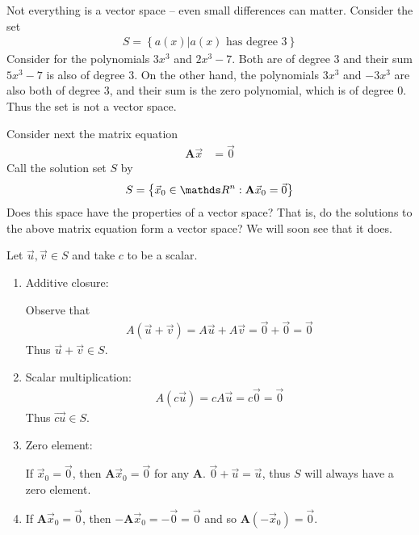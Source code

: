 \documentclass[11pt]{article}
\newcommand{\mat}[1]{\mathbf{#1}}
\newcommand{\vek}[1]{\vec{#1}}
\begin{document}
Not everything is a vector space -- even small differences can matter. Consider the set
\begin{align*}
S = \left\{ a(x) | \text{$a(x)$ has degree $3$} \right\}
\end{align*}
Consider for the polynomials $3 x^3$ and $2x^3 - 7$. Both are of degree $3$ and their sum $5x^3 - 7$ is also of degree $3$. On the other hand, the polynomials $3 x^3$ and $-3x^3$ are also both of degree $3$, and their sum is the zero polynomial, which is of degree $0$. Thus the set is not a vector space.

Consider next the matrix equation
\begin{align*}
\mat{A} \vek{x} &= \vek{0}
\end{align*}
Call the solution set $S$ by
\begin{align*}
S = \left\{ \vek{x}_0 \in \bbR^n : \mat{A} \vek{x}_0 = \vek{0} \right\}
\end{align*}
Does this space have the properties of a vector space? That is, do the solutions to the above matrix equation form a vector space? We will soon see that it does.

Let $\vek{u}, \vek{v} \in S$ and take $c$ to be a scalar.
\begin{enumerate}
\item{
Additive closure:

Observe that
\begin{align*}
A ( \vek{u} + \vek{v} ) = A \vek{u} + A \vek{v} = \vek{0} + \vek{0} = \vek{0}
\end{align*}
Thus $\vek{u} + \vek{v} \in S$.
}
\item{
Scalar multiplication:
\begin{align*}
A ( c \vek{u} ) = c A \vek{u} = c \vek{0} = \vek{0}
\end{align*}
Thus $\vek{c u} \in S$.
}
\item{
Zero element:

If $\vek{x}_0 = \vek{0}$, then $\mat{A} \vek{x}_0 = \vek{0}$ for any $\mat{A}$. $\vek{0} + \vek{u} = \vek{u}$, thus $S$ will always have a zero element.
}
\item{
If $\mat{A} \vek{x}_0 = \vek{0}$, then $- \mat{A} \vek{x}_0 = - \vek{0} = \vek{0}$ and so $\mat{A} \left( - \vek{x}_0 \right) = \vek{0}$.
}
\end{enumerate}
\end{document}
